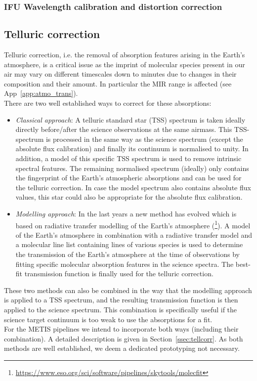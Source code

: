 \subsubsection{IFU Wavelength calibration and distortion correction}\label{ssec:criticalwavelengthanddistortionifu}


\subsection{Telluric correction}\label{ssec:criticaltelluriccorrection}
Telluric correction, i.e. the removal of absorption features arising in the Earth's atmosphere, is a critical issue as the imprint of molecular species present in our air may vary on different timescales down to minutes due to changes in their composition and their amount. In particular the \ac{MIR} range is affected (see App~\ref{app:atmo_trans}).\\
There are two well established ways to correct for these absorptions:
\begin{itemize}
    \item \textit{Classical approach}: A telluric standard star (\ac{TSS}) spectrum is taken ideally directly before/after the science observations at the same airmass. This \ac{TSS}-spectrum is processed in the same way as the science spectrum (except the absolute flux calibration) and finally its continuum is normalised to unity. In addition, a model of this specific \ac{TSS} spectrum is used to remove intrinsic spectral features. The remaining normalised spectrum (ideally) only contains the fingerprint of the Earth's atmospheric absorptions and can be used for the telluric correction. In case the model spectrum also contains absolute flux values, this star could also be appropriate for the absolute flux calibration.
    \item \textit{Modelling approach}: In the last years a new method has evolved which is based on radiative transfer modelling of the Earth's atmosphere (\cite{mf1, mf2, molecfit}\footnote{\url{https://www.eso.org/sci/software/pipelines/skytools/molecfit}}). A model of the Earth's atmosphere in combination with a radiative transfer model and a molecular line list containing lines of various species is used to determine the transmission of the Earth's atmosphere at the time of observations by fitting specific molecular absorption features in the science spectra. The best-fit transmission function is finally used for the telluric correction.
\end{itemize}
These two methods can also be combined in the way that the modelling approach is applied to a \ac{TSS} spectrum, and the resulting transmission function is then applied to the science spectrum. This combination is specifically useful if the science target continuum is too weak to use the absorptions for a fit.\\
For the \ac{METIS} pipelines we intend to incorporate both ways (including their combination). A detailed description is given in Section~\ref{ssec:tellcorr}. As both methods are well established, we deem a dedicated prototyping not necessary.

